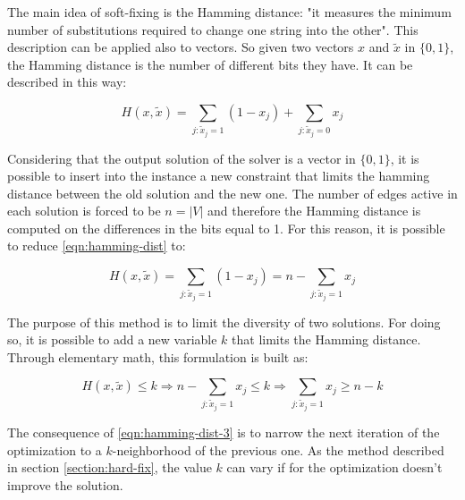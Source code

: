 The main idea of soft-fixing is the Hamming distance: "it measures the minimum number of substitutions required to change one string into the other"\cite{hamming-distance}. This description can be applied also to vectors. So given two vectors $x$ and $\tilde{x}$ in $\{0,1\}$, the Hamming distance is the number of different bits they have. It can be described in this way:

\begin{equation}
\label{eqn:hamming-dist}
H(x, \tilde{x}) = \sum_{j:\tilde{x}_j=1}(1-x_j)+\sum_{j:\tilde{x}_j=0}x_j
\end{equation}

Considering that the output solution of the solver is a vector in $\{0, 1\}$, it is possible to insert into the instance a new constraint that limits the hamming distance between the old solution and the new one.
The number of edges active in each solution is forced to be $n=|V|$ and therefore the Hamming distance is computed on the differences in the bits equal to 1. For this reason, it is possible to reduce \ref{eqn:hamming-dist} to:

\begin{equation}
\label{eqn:hamming-dist-2}
H(x, \tilde{x}) = \sum_{j:\tilde{x}_j=1}(1-x_j) =  n - \sum_{j:\tilde{x}_j=1}x_j
\end{equation}

The purpose of this method is to limit the diversity of two solutions. For doing so, it is possible to add a new variable $k$ that limits the Hamming distance. Through elementary math, this formulation is built as:

\begin{equation}
\label{eqn:hamming-dist-3}
H(x, \tilde{x}) \le k \Rightarrow n - \sum_{j:\tilde{x}_j=1}x_j \le k \Rightarrow \sum_{j:\tilde{x}_j=1}x_j \ge n - k
\end{equation}

The consequence of \ref{eqn:hamming-dist-3} is to narrow the next iteration of the optimization to a $k$-neighborhood of the previous one. As the method described in section \ref{section:hard-fix}, the value $k$ can vary if for the optimization doesn't improve the solution. 


